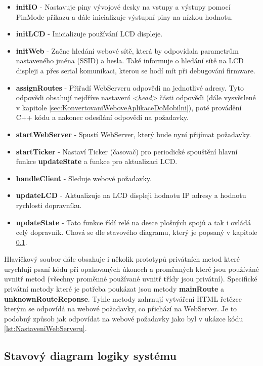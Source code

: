 \begin{itemize}
	\item \textbf{initIO} - Nastavuje piny vývojové desky na vstupy a výstupy pomocí PinMode příkazu a dále inicializuje výstupní piny na nízkou hodnotu.
	\item \textbf{initLCD} - Inicializuje používání LCD displeje.
	\item \textbf{initWeb} - Začne hledání webové sítě, která by odpovídala parametrům nastaveného jména (SSID) a hesla. Také informuje o hledání sítě na LCD displeji a přes serial komunikaci, kterou se hodí mít při debugování firmware.
	\item \textbf{assignRoutes} - Přiřadí WebServeru odpovědi na jednotlivé adresy. Tyto odpovědi obsahují nejdříve nastavení \textit{<head>} části odpověďi (dále vysvětlené v kapitole \ref{sec:KonvertovaniWeboveAplikaceDoMobilni}), poté provádění C++ kódu a nakonec odesílání odpovědí na požadavky.
	\item \textbf{startWebServer} - Spustí WebServer, který bude nyní přijímat požadavky.
	\item \textbf{startTicker} - Nastaví Ticker (časovač) pro periodické spouštění hlavní funkce \textbf{updateState} a funkce pro aktualizaci LCD.
	\item \textbf{handleClient} - Sleduje webové požadavky.
	\item \textbf{updateLCD} - Aktualizuje na LCD displeji hodnotu IP adresy a hodnotu rychlosti dopravníku.
	\item \textbf{updateState} - Tato funkce řídí relé na desce plošných spojů a tak i ovládá celý dopravník. Chová se dle stavového diagramu, který je popsaný v kapitole \ref{sec:UpdateStateStavovyDiagram}.
\end{itemize}

Hlavičkový soubor dále obsahuje i několik prototypů privátních metod které urychlují psaní kódu při opakovaných úkonech a proměnných které jsou používáné uvnitř metod (všechny proměnné používané uvnitř třídy jsou privátní). Specifické privátní metody které je potřeba poukázat jsou metody \textbf{mainRoute} a \textbf{unknownRouteReponse}. Tyhle metody zahrnují vytváření HTML řetězce kterým se odpovídá na webové požadavky, co přichází na WebServer. Je to podobný způsob jak odpovídat na webové požadavky jako byl v ukázce kódu \ref{lst:NastaveniWebServeru}.

\subsection{Stavový diagram logiky systému}\label{sec:UpdateStateStavovyDiagram}

